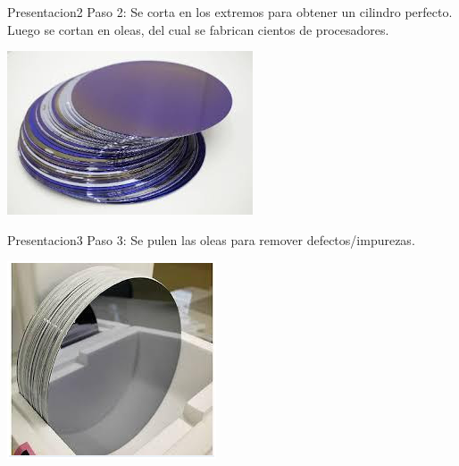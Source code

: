 \documentclass[presentation]{beamer}
\begin{document}
\begin{frame}[label={sec:orgf546210}]{Presentacion2}
Paso 2:
Se corta en los extremos para obtener un cilindro perfecto.
Luego se cortan en oleas, del cual se fabrican cientos de procesadores.
\begin{center}
\includegraphics[width=.9\linewidth]{./paso2.jpeg}
\end{center}
\end{frame}

\begin{frame}[label={sec:org04d1dfa}]{Presentacion3}
Paso 3:
Se pulen las oleas para remover defectos/impurezas.
\begin{center}
\includegraphics[width=.9\linewidth]{./paso3.png}
\end{center}
\end{frame}
\end{document}
